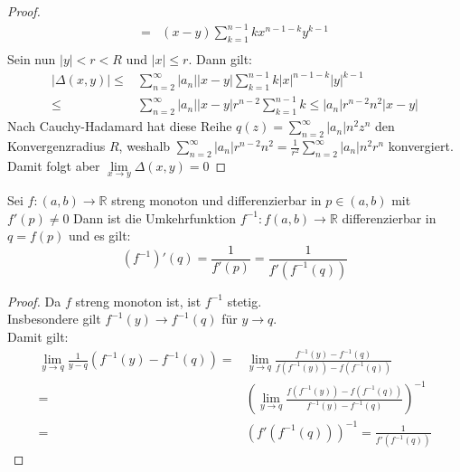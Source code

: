 \begin{proof}
\begin{align*}
		= &(x -y) \sum_{k=1}^{n-1}kx^{n-1-k}y^{k-1} \\
	\end{align*}
	Sein nun $\vert y\vert < r < R$ und $|x| \leq r$. Dann gilt:
	\begin{align*}
		\vert \Delta(x,y)\vert \leq & 
		\sum_{n=2}^{\infty} |a_n| |x-y| \sum_{k=1}^{n-1} 
		k|x|^{n-1-k}|y|^{k-1} \\
		\leq & \sum_{n=2}^{\infty} |a_n| |x-y|r^{n-2} \sum_{k=1}^{n-1}k 
		\leq |a_n|r^{n-2}n^2|x-y|
	\end{align*}
	Nach Cauchy-Hadamard hat diese Reihe $q(z) = \sum_{n=2}^{\infty} |a_n|n^2z^n$ 
	den Konvergenzradius $R$, weshalb $\sum_{n=2}^{\infty} |a_n| r^{n-2} n^2 
	= \frac{1}{r^2}\sum_{n=2}^{\infty} |a_n|n^2r^n$ konvergiert.
	Damit folgt aber $\lim\limits_{x \rightarrow y}{\Delta(x,y) = 0}$
\end{proof}

\begin{Proposition}{
	Sei $f: \left(a,b\right) \rightarrow \mathbb{R}$ streng monoton und 
	differenzierbar in $p \in \left(a, b\right)$ mit $f'\left(p\right) \neq 0$
	Dann ist die Umkehrfunktion $f^{-1}: f\left(a,b\right) \rightarrow \mathbb{R}$
	differenzierbar in $q = f(p)$ und es gilt: 
	\begin{equation*}
		\left( f^{-1}\right)'\left(q\right) = \frac{1}{f'(p)} =
		 \frac{1}{f'(f^{-1}(q))}
	\end{equation*}
}\end{Proposition}

\begin{proof}
	Da $f$ streng monoton ist, ist $f^{-1}$  stetig. \\
	Insbesondere gilt $f^{-1}(y) \rightarrow f^{-1}(q)$ für $y \rightarrow q$.\\
	Damit gilt:
	\begin{align*}		
	 \lim\limits_{y \rightarrow q}
		{\frac{1}{y-q} \left( f^{-1}(y) - f^{-1}(q) \right) }
		= & \lim\limits_{y \rightarrow q}
		{\frac{f^{-1}(y) - f^{-1}(q)}{f(f^{-1}(y)) - f(f^{-1}(q)) }} \\
		= &\left( \lim\limits_{y \rightarrow q}
		{\frac{f(f^{-1}(y)) - f(f^{-1}(q))}
		{f^{-1}(y) - f^{-1}(q)} } \right)^{-1} \\
		= & \left(f'(f^{-1}(q))\right)^{-1}
		=  \frac{1}{f'\left( f^{-1}(q) \right)}		
	\end{align*}
\end{proof}

